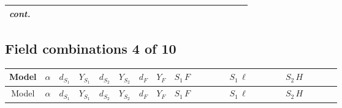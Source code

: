 \documentclass[8pt]{article}
\begin{document}
\begin{landscape}
\begin{longtable}{@{}cccccccc >{\raggedright\arraybackslash}p{0.21\linewidth} >{\raggedright\arraybackslash}p{0.21\linewidth} >{\raggedright\arraybackslash}p{0.21\linewidth}@{}}
\textit{cont.} &  &  &  &  &  &  &  &  &  & \scriptsize\adjustbox{max width=\linewidth}{$\begin{gathered} -\frac{2 \hbar  \overline{y_{2,i_1,r_1}} S_{1,j_3} S_{2,j_4} y_{2,i_1,r_1} S_{1,j_1}{}^{\dagger } S_{2,j_2}{}^{\dagger } \mathcal{I}_{12,j_1,j_3,j_2,j_4}{}^3 \lambda_{12}^{(1)}^{(3)}}{\sqrt{3} \epsilon } \\ -\frac{\hbar  \overline{y_{2,i_1,r_1}} S_{1,j_3} S_{2,j_4} y_{2,i_1,r_1} S_{1,j_1}{}^{\dagger } S_{2,j_2}{}^{\dagger } \mathcal{I}_{12,j_1,j_3,j_2,j_4}{}^3 \lambda_{12}^{(1)}^{(3)}}{\sqrt{3}}\end{gathered}$} \\
\midrule
\bottomrule
\end{longtable}
\clearpage
\subsection*{Field combinations 4 of 10}
\begin{longtable}{@{}cccccccc >{\raggedright\arraybackslash}p{0.21\linewidth} >{\raggedright\arraybackslash}p{0.21\linewidth} >{\raggedright\arraybackslash}p{0.21\linewidth}@{}}
\toprule
Model & $\alpha$ & $d_{S_1}$ & $Y_{S_1}$ & $d_{S_2}$ & $Y_{S_2}$ & $d_F$ & $Y_F$ & $S_1\,F$ & $S_1\,\ell$ & $S_2\,H$ \\
\midrule
\endfirsthead
\toprule
Model & $\alpha$ & $d_{S_1}$ & $Y_{S_1}$ & $d_{S_2}$ & $Y_{S_2}$ & $d_F$ & $Y_F$ & $S_1\,F$ & $S_1\,\ell$ & $S_2\,H$ \\
\midrule
\endhead

\end{longtable}
\end{landscape}
\end{document}
